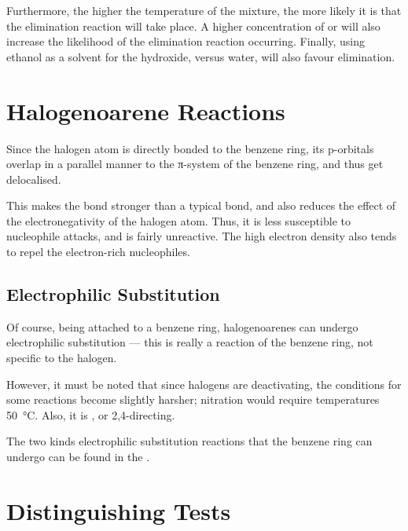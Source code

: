 			Furthermore, the higher the temperature of the mixture, the more likely it is that the elimination reaction will take place.
			A higher concentration of  or  will also increase the likelihood of the elimination reaction occurring.
			Finally, using ethanol as a solvent for the hydroxide, versus water, will also favour elimination.



	\pagebreak
	\section{Halogenoarene Reactions}

		Since the halogen atom is directly bonded to the benzene ring, its p-orbitals overlap in a parallel manner to the π-system of the
		benzene ring, and thus get delocalised.


		This makes the bond stronger than a typical  bond, and also reduces the effect of the electronegativity of the halogen atom.
		Thus, it is less susceptible to nucleophile attacks, and is fairly unreactive. The high electron density also tends to repel the
		electron-rich nucleophiles.


		\subsection{Electrophilic Substitution}

			Of course, being attached to a benzene ring, halogenoarenes can undergo electrophilic substitution --- this is really a reaction
			of the benzene ring, not specific to the halogen.

			However, it must be noted that since halogens are deactivating, the conditions for some reactions become slightly harsher;
			nitration would require temperatures  \SI{50}{\celsius}. Also, it is , or 2,4-directing.

			The two kinds electrophilic substitution reactions that the benzene ring can undergo can be found in the
			\hyperlink{AreneReactions}{}.



	\pagebreak
	\section{Distinguishing Tests}

